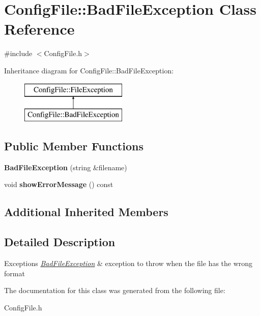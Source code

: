 \hypertarget{class_config_file_1_1_bad_file_exception}{}\section{Config\+File\+:\+:Bad\+File\+Exception Class Reference}
\label{class_config_file_1_1_bad_file_exception}


{\ttfamily \#include $<$Config\+File.\+h$>$}

Inheritance diagram for Config\+File\+:\+:Bad\+File\+Exception\+:\begin{figure}[H]
\begin{center}
\leavevmode
\includegraphics[height=2.000000cm]{class_config_file_1_1_bad_file_exception}
\end{center}
\end{figure}
\subsection*{Public Member Functions}
\begin{DoxyCompactItemize}
\item 
\hypertarget{class_config_file_1_1_bad_file_exception_a890ccce3543b355a3b514790e4218521}{}{\bfseries Bad\+File\+Exception} (string \&filename)\label{class_config_file_1_1_bad_file_exception_a890ccce3543b355a3b514790e4218521}

\item 
\hypertarget{class_config_file_1_1_bad_file_exception_a8f55fca6a89e4b32062abb2254b26155}{}void {\bfseries show\+Error\+Message} () const \label{class_config_file_1_1_bad_file_exception_a8f55fca6a89e4b32062abb2254b26155}

\end{DoxyCompactItemize}
\subsection*{Additional Inherited Members}


\subsection{Detailed Description}

\begin{DoxyExceptions}{Exceptions}
{\em \hyperlink{class_config_file_1_1_bad_file_exception}{Bad\+File\+Exception}} & exception to throw when the file has the wrong format \\
\hline
\end{DoxyExceptions}


The documentation for this class was generated from the following file\+:\begin{DoxyCompactItemize}
\item 
Config\+File.\+h\end{DoxyCompactItemize}
